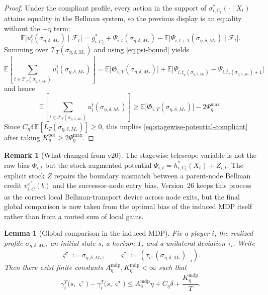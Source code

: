 \documentclass[12pt]{article}
\newtheorem{lemma}[theorem]{Lemma}
\theoremstyle{definition}
\newtheorem{remark}[theorem]{Remark}
\newcommand{\E}{\mathbb{E}}
\newcommand{\1}{\mathbf{1}}
\newcommand{\cF}{\mathcal{F}}
\begin{document}
\begin{proof}
Under the compliant profile, every action in the support of
$\sigma_{i,C_t}^*(\cdot\mid X_t)$ attains equality in the Bellman system, so the
previous display is an equality without the $+\eta$ term:
\[
\E\bigl[u_i^t(\sigma_{\eta,\delta,M_*})\mid \cF_t\bigr]
=
g_{i,C_t}^*
+
\Psi_{i,t}(\sigma_{\eta,\delta,M_*})
-
\E\bigl[\Psi_{i,t+1}(\sigma_{\eta,\delta,M_*})\mid \cF_t\bigr].
\]
Summing over $\mathcal T_T(\sigma_{\eta,\delta,M_*})$ and using
\eqref{eq:psi-bound} yields
\[
\E\left[
\sum_{t\in\mathcal T_T(\sigma_{\eta,\delta,M_*})}
u_i^t(\sigma_{\eta,\delta,M_*})
\right]
=
\E\bigl[\mathfrak G_{i,T}(\sigma_{\eta,\delta,M_*})\bigr]
+
\E\bigl[
\Psi_{i,\underline t_T(\sigma_{\eta,\delta,M_*})}
-
\Psi_{i,\overline t_T(\sigma_{\eta,\delta,M_*})+1}
\bigr]
\]
and hence
\[
\E\left[
\sum_{t\in\mathcal T_T(\sigma_{\eta,\delta,M_*})}
u_i^t(\sigma_{\eta,\delta,M_*})
\right]
\ge
\E\bigl[\mathfrak G_{i,T}(\sigma_{\eta,\delta,M_*})\bigr]
-
2\Psi_\eta^{\max}.
\]
Since $C_\eta\delta\,\E[L_T(\sigma_{\eta,\delta,M_*})]\ge 0$, this implies
\eqref{eq:stagewise-potential-compliant} after taking
$K_\eta^{\mathrm{pot}}\ge 2\Psi_\eta^{\max}$.
\end{proof}

\begin{remark}[What changed from v20]
The stagewise telescope variable is not the raw bias $\Phi_{i,t}$ but the
stock-augmented potential $\Psi_{i,t}=h_{i,C_t}^*(X_t)+Z_{i,t}$. The explicit
stock $Z$ repairs the boundary mismatch between a parent-node Bellman credit
$v_{i,C}^{x^*}(b)$ and the successor-node entry bias. Version~26 keeps this
process as the correct local Bellman-transport device across node exits, but the
final global comparison is now taken from the optimal bias of the induced MDP
itself rather than from a routed sum of local gains.
\end{remark}

\begin{lemma}[Global comparison in the induced MDP]
\label{lem:global-mdp-comparison}
Fix a player $i$, the realized profile $\sigma_{\eta,\delta,M_*}$, an initial
state $s$, a horizon $T$, and a unilateral deviation $\tau_i$. Write
\[
\varsigma^\sigma:=\sigma_{\eta,\delta,M_*},
\qquad
\varsigma^\tau:=(\tau_i,(\sigma_{\eta,\delta,M_*})_{-i}).
\]
Then there exist finite constants
$A_\eta^{\mathrm{mdp}},K_\eta^{\mathrm{mdp}}<\infty$ such that
\begin{equation}
\label{eq:global-mdp-comparison}
\gamma_i^T\bigl(s,\varsigma^\tau\bigr)
-
\gamma_i^T\bigl(s,\varsigma^\sigma\bigr)
\le
A_\eta^{\mathrm{mdp}}\eta + C_\eta\delta + \frac{K_\eta^{\mathrm{mdp}}}{T}.
\end{equation}
\end{lemma}
\end{document}
